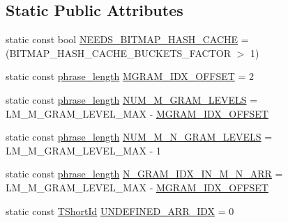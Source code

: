 \subsection*{Static Public Attributes}
\begin{DoxyCompactItemize}
\item 
static const bool \hyperlink{classuva_1_1smt_1_1bpbd_1_1server_1_1lm_1_1generic__trie__base_a75a5cd884a3ea7088aa85f418ee04689}{N\+E\+E\+D\+S\+\_\+\+B\+I\+T\+M\+A\+P\+\_\+\+H\+A\+S\+H\+\_\+\+C\+A\+C\+H\+E} = (B\+I\+T\+M\+A\+P\+\_\+\+H\+A\+S\+H\+\_\+\+C\+A\+C\+H\+E\+\_\+\+B\+U\+C\+K\+E\+T\+S\+\_\+\+F\+A\+C\+T\+O\+R $>$ 1)
\item 
static const \hyperlink{namespaceuva_1_1smt_1_1bpbd_1_1server_af068a19c2e03116caf3e3827a3e40e35}{phrase\+\_\+length} \hyperlink{classuva_1_1smt_1_1bpbd_1_1server_1_1lm_1_1generic__trie__base_abcd0fc0a9413690cc1f763e20a4fadc3}{M\+G\+R\+A\+M\+\_\+\+I\+D\+X\+\_\+\+O\+F\+F\+S\+E\+T} = 2
\item 
static const \hyperlink{namespaceuva_1_1smt_1_1bpbd_1_1server_af068a19c2e03116caf3e3827a3e40e35}{phrase\+\_\+length} \hyperlink{classuva_1_1smt_1_1bpbd_1_1server_1_1lm_1_1generic__trie__base_ae417bb22c7bfd06f05395bcba71ae0f1}{N\+U\+M\+\_\+\+M\+\_\+\+G\+R\+A\+M\+\_\+\+L\+E\+V\+E\+L\+S} = L\+M\+\_\+\+M\+\_\+\+G\+R\+A\+M\+\_\+\+L\+E\+V\+E\+L\+\_\+\+M\+A\+X -\/ \hyperlink{classuva_1_1smt_1_1bpbd_1_1server_1_1lm_1_1generic__trie__base_abcd0fc0a9413690cc1f763e20a4fadc3}{M\+G\+R\+A\+M\+\_\+\+I\+D\+X\+\_\+\+O\+F\+F\+S\+E\+T}
\item 
static const \hyperlink{namespaceuva_1_1smt_1_1bpbd_1_1server_af068a19c2e03116caf3e3827a3e40e35}{phrase\+\_\+length} \hyperlink{classuva_1_1smt_1_1bpbd_1_1server_1_1lm_1_1generic__trie__base_a36f637557d96e844b2b1b92be9745813}{N\+U\+M\+\_\+\+M\+\_\+\+N\+\_\+\+G\+R\+A\+M\+\_\+\+L\+E\+V\+E\+L\+S} = L\+M\+\_\+\+M\+\_\+\+G\+R\+A\+M\+\_\+\+L\+E\+V\+E\+L\+\_\+\+M\+A\+X -\/ 1
\item 
static const \hyperlink{namespaceuva_1_1smt_1_1bpbd_1_1server_af068a19c2e03116caf3e3827a3e40e35}{phrase\+\_\+length} \hyperlink{classuva_1_1smt_1_1bpbd_1_1server_1_1lm_1_1generic__trie__base_afa36dc040835f6265670b1c03eb85e72}{N\+\_\+\+G\+R\+A\+M\+\_\+\+I\+D\+X\+\_\+\+I\+N\+\_\+\+M\+\_\+\+N\+\_\+\+A\+R\+R} = L\+M\+\_\+\+M\+\_\+\+G\+R\+A\+M\+\_\+\+L\+E\+V\+E\+L\+\_\+\+M\+A\+X -\/ \hyperlink{classuva_1_1smt_1_1bpbd_1_1server_1_1lm_1_1generic__trie__base_abcd0fc0a9413690cc1f763e20a4fadc3}{M\+G\+R\+A\+M\+\_\+\+I\+D\+X\+\_\+\+O\+F\+F\+S\+E\+T}
\item 
static const \hyperlink{namespaceuva_1_1smt_1_1bpbd_1_1server_1_1lm_1_1identifiers_a33043a191e9a637dea742a89d23c8bdc}{T\+Short\+Id} \hyperlink{classuva_1_1smt_1_1bpbd_1_1server_1_1lm_1_1generic__trie__base_a3e961dc1d0e7bd38134573227f818b8b}{U\+N\+D\+E\+F\+I\+N\+E\+D\+\_\+\+A\+R\+R\+\_\+\+I\+D\+X} = 0

\end{DoxyCompactItemize}
